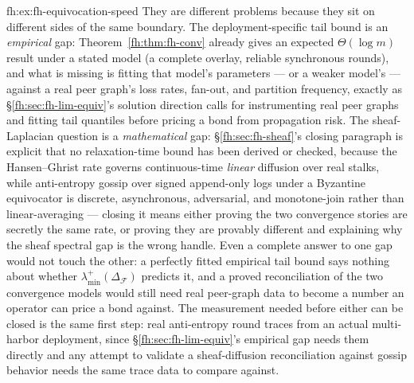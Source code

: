 \begin{pdSolution}{fh:ex:fh-equivocation-speed}
They are different problems because they sit on different sides of the same boundary. The deployment-specific tail bound is an \emph{empirical} gap: Theorem~\ref{fh:thm:fh-conv} already gives an expected $\Theta(\log m)$ result under a stated model (a complete overlay, reliable synchronous rounds), and what is missing is fitting that model's parameters --- or a weaker model's --- against a real peer graph's loss rates, fan-out, and partition frequency, exactly as \S\ref{fh:sec:fh-lim-equiv}'s solution direction calls for instrumenting real peer graphs and fitting tail quantiles before pricing a bond from propagation risk. The sheaf-Laplacian question is a \emph{mathematical} gap: \S\ref{fh:sec:fh-sheaf}'s closing paragraph is explicit that no relaxation-time bound has been derived or checked, because the Hansen--Ghrist rate governs continuous-time \emph{linear} diffusion over real stalks, while anti-entropy gossip over signed append-only logs under a Byzantine equivocator is discrete, asynchronous, adversarial, and monotone-join rather than linear-averaging --- closing it means either proving the two convergence stories are secretly the same rate, or proving they are provably different and explaining why the sheaf spectral gap is the wrong handle. Even a complete answer to one gap would not touch the other: a perfectly fitted empirical tail bound says nothing about whether $\lambda_{\min}^{+}(\Delta_{\mathcal F})$ predicts it, and a proved reconciliation of the two convergence models would still need real peer-graph data to become a number an operator can price a bond against. The measurement needed before either can be closed is the same first step: real anti-entropy round traces from an actual multi-harbor deployment, since \S\ref{fh:sec:fh-lim-equiv}'s empirical gap needs them directly and any attempt to validate a sheaf-diffusion reconciliation against gossip behavior needs the same trace data to compare against.
\end{pdSolution}

